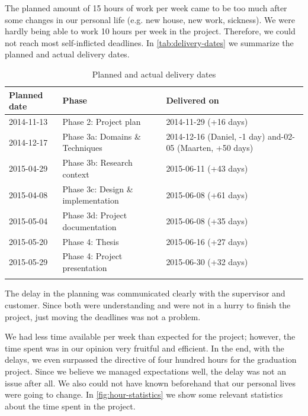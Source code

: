 The planned amount of 15 hours of work per week came to be too much after some changes in our personal life (e.g. new house, new work, sickness).
We were hardly being able to work 10 hours per week in the project.
Therefore, we could not reach most self-inflicted deadlines.
In \autoref{tab:delivery-dates} we summarize the planned and actual delivery dates.%
%
\begin{longtable}{|l|l|p{6cm}|}\hline
    \textbf{Planned date} & \textbf{Phase} & \textbf{Delivered on} \\\hline
	\endhead
    2014-11-13 & Phase 2: Project plan  & 2014-11-29 (+16 days)\\\hline
    2014-12-17 & Phase 3a: Domains \& Techniques  & 2014-12-16 (Daniel, -1 day) and\newline
                                                    2015-02-05 (Maarten, +50 days) \\\hline
    2015-04-29 & Phase 3b: Research context  & 2015-06-11 (+43 days) \\\hline
    2015-04-08 & Phase 3c: Design \& implementation  & 2015-06-08 (+61 days) \\\hline
    2015-05-04 & Phase 3d: Project documentation  & 2015-06-08 (+35 days) \\\hline
    2015-05-20 & Phase 4: Thesis  & 2015-06-16 (+27 days) \\\hline
    2015-05-29 & Phase 4: Project presentation  & 2015-06-30 (+32 days) \\\hline
  \caption{Planned and actual delivery dates}
  \label{tab:delivery-dates}
\end{longtable}%
%
The delay in the planning was communicated clearly with the supervisor and customer.
Since both were understanding and were not in a hurry to finish the project, just moving the deadlines was not a problem.

We had less time available per week than expected for the project; however, the time spent was in our opinion very fruitful and efficient.
In the end, with the delays, we even surpassed the directive of four hundred hours for the graduation project.
Since we believe we managed expectations well, the delay was not an issue after all.
We also could not have known beforehand that our personal lives were going to change.
In \autoref{fig:hour-statistics} we show some relevant statistics about the time spent in the project.

